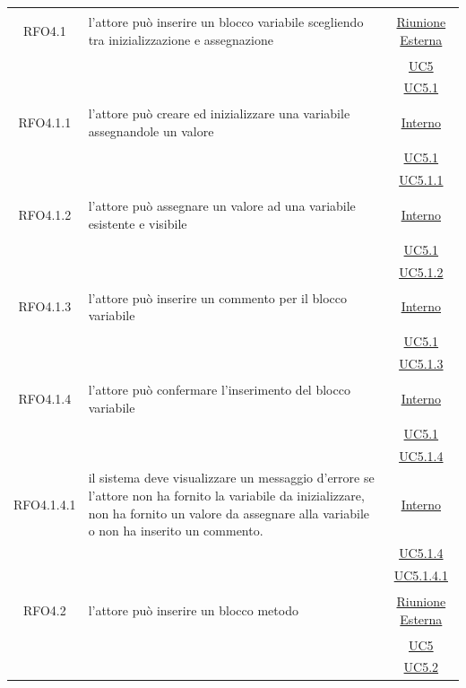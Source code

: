 \begin{itemize}
\begin{itemize}
\begin{itemize}
\begin{itemize}
\begin{longtable}{|c|>{\centering}m{7cm}|c|}
\hypertarget{RFO4.1}{RFO4.1} & l'attore può inserire un blocco variabile scegliendo tra inizializzazione e assegnazione &  \hyperlink{Riunione Esterna}{Riunione Esterna}\\
& &\hyperref[UC5]{UC5}\\
& &\hyperref[UC5.1]{UC5.1}\\ \hline

\hypertarget{RFO4.1.1}{RFO4.1.1} & l'attore può creare ed inizializzare una variabile assegnandole un valore & \hyperlink{Interno}{Interno}\\
& &\hyperref[UC5.1]{UC5.1}\\
& &\hyperref[UC5.1.1]{UC5.1.1}\\ \hline

\hypertarget{RFO4.1.2}{RFO4.1.2} & l'attore può assegnare un valore ad una variabile esistente e visibile & \hyperlink{Interno}{Interno}\\
& &\hyperref[UC5.1]{UC5.1}\\
& &\hyperref[UC5.1.2]{UC5.1.2}\\ \hline

\hypertarget{RFO4.1.3}{RFO4.1.3} & l'attore può inserire un commento per il blocco variabile & \hyperlink{Interno}{Interno}\\
& &\hyperref[UC5.1]{UC5.1}\\
& &\hyperref[UC5.1.3]{UC5.1.3}\\ \hline

\hypertarget{RFO4.1.4}{RFO4.1.4} & l'attore può confermare l'inserimento del blocco variabile &\hyperlink{Interno}{Interno}\\
& &\hyperref[UC5.1]{UC5.1}\\
& &\hyperref[UC5.1.4]{UC5.1.4}\\ \hline

\hypertarget{RFO4.1.4.1}{RFO4.1.4.1} & il sistema deve visualizzare un messaggio d'errore se l'attore non ha fornito la variabile da inizializzare, non ha fornito un valore da assegnare alla variabile o non ha inserito un commento. & \hyperlink{Interno}{Interno}\\
& &\hyperref[UC5.1.4]{UC5.1.4}\\
& &\hyperref[UC5.1.4.1]{UC5.1.4.1}\\ \hline

\hypertarget{RFO4.2}{RFO4.2} & l'attore può inserire un blocco metodo & \hyperlink{Riunione Esterna}{Riunione Esterna}\\
& &\hyperref[UC5]{UC5}\\
& &\hyperref[UC5.2]{UC5.2}\\ \hline


\end{longtable}
\end{itemize}
\end{itemize}
\end{itemize}
\end{itemize}
